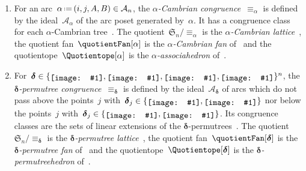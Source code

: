 \documentclass{amsart}
\theoremstyle{definition}
\newcommand{\f}[1]{{\mathfrak{#1}}} %
\renewcommand{\b}[1]{{\boldsymbol{#1}}} %
\newcommand{\eqdef}{\mbox{\,\raisebox{0.2ex}{\scriptsize\ensuremath{\mathrm:}}\ensuremath{=}\,}} %
\newcommand{\darkblue}{\color{darkblue}} %
\newcommand{\defn}[1]{\textsl{\darkblue #1}} %
\newcommand{\arc}{\alpha} %
\newcommand{\arcs}{{\mathcal{A}}} %
\newcommand{\decoration}{{\b{\delta}}} %
\newcommand{\includeSymbol}[1]{\ensuremath{%
	\mathchoice
		{\raisebox{-.7mm}{\texttt{[image: \#1]}}}	
		{\raisebox{-.7mm}{\texttt{[image: \#1]}}}
		{\raisebox{-.6mm}{\texttt{[image: \#1]}}}
		{\raisebox{-.5mm}{\texttt{[image: \#1]}}}
}}
\newcommand{\noneCirc}{\includeSymbol{none}}
\newcommand{\upCirc}{\includeSymbol{up}}
\newcommand{\downCirc}{\includeSymbol{down}}
\newcommand{\upDownCirc}{\includeSymbol{updown}}
\newcommand{\Decorations}{\{\noneCirc{}, \downCirc{}, \upCirc{}, \upDownCirc{}\}} %
\begin{document}
\begin{enumerate}
\item \label{item:CambrianCongruence}
For an arc~$\arc \eqdef (i, j, A, B) \in \arcs_n$, the \defn{$\arc$-Cambrian congruence}~$\equiv_\arc$ is defined by the ideal~$\arcs_\arc$ of the arc poset generated by~$\arc$.
It has a congruence class for each  $\arc$-Cambrian tree~\cite{LangePilaud, ChatelPilaud, PilaudPons-permutrees}.
The quotient~$\f{S}_n / {\equiv_\arc}$ is the \defn{$\arc$-Cambrian lattice}~\cite{Reading-CambrianLattices}, the quotient fan~$\quotientFan[\arc]$ is the \defn{$\arc$-Cambrian fan} of~\cite{ReadingSpeyer} and the quotientope~$\Quotientope[\arc]$ is the \defn{$\arc$-associahedron} of~\cite{HohlwegLange}.

\item \label{item:permutreeCongruence}
For~$\decoration \in \Decorations^n$, the \defn{$\decoration$-permutree congruence}~$\equiv_\decoration$ is defined by the ideal~$\arcs_\decoration$ of arcs which do not pass above the points~$j$ with~$\decoration_j \in \{\upCirc, \upDownCirc\}$ nor below the points~$j$ with~${\decoration_j \in \{\downCirc, \upDownCirc\}}$.
Its congruence classes are the sets of linear extensions of the \linebreak $\decoration$-permutrees~\cite{PilaudPons-permutrees}.
The quotient~$\f{S}_n / {\equiv_\decoration}$ is the \defn{$\decoration$-permutree lattice}~\cite{PilaudPons-permutrees}, the quotient fan~$\quotientFan[\decoration]$ is the \defn{$\decoration$-permutree fan} of~\cite{PilaudPons-permutrees} and the quotientope~$\Quotientope[\decoration]$ is the \defn{$\decoration$-permutreehedron} of~\cite{PilaudPons-permutrees}.


\end{enumerate}
\end{document}
